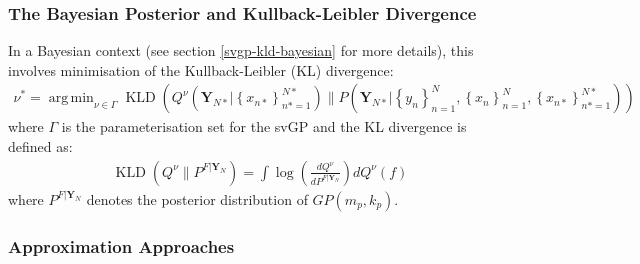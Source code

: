 \documentclass{article}
\newtheorem{theorem}{THEOREM}
\newtheorem{definition}[theorem]{DEFINITION}
\newenvironment{proof}{
PROOF:
\begin{quotation}}{
$\Box$ \end{quotation}}
\newcommand{\nats}{\mbox{\( \mathbb N \)}}
\newcommand{\KLD}{\operatorname{KLD}}
\DeclareMathOperator*{\argmin}{arg\,min}
\numberwithin{equation}{section}
\begin{document}
\subsubsection{The Bayesian Posterior and Kullback-Leibler Divergence}
In a Bayesian context (see section \ref{svgp-kld-bayesian} for more details), this involves minimisation of the Kullback-Leibler (KL) divergence:
\begin{align}
    \nu^* = \argmin_{\nu \in \Gamma} \KLD\left(Q^\nu\left(\mathbf{Y}_{N*} \Big\vert \left\{ x_{n*}\right\}_{n*=1}^{N*}\right) \Big\| P\left(\mathbf{Y}_{N*} \Big\vert \left\{ y_n\right\}_{n=1}^N,  \left\{ x_n\right\}_{n=1}^N,  \left\{ x_{n*}\right\}_{n*=1}^{N*}\right) \right)
    \label{svgp-minimiser}
\end{align}
where $\Gamma$ is the parameterisation set for the svGP and the KL divergence is defined as:
\begin{align}
    \KLD\left(Q^{\nu} \Big\| P^{F \vert \mathbf{Y}_N} \right) = \int \log \left( \frac{dQ^{\nu}}{d P^{F \vert \mathbf{Y}_N}} \right) d Q^{\nu}(f)
    \label{svgp-kld-loss}
\end{align}
where $P^{F \vert \mathbf{Y}_N}$ denotes the posterior distribution of $GP(m_p, k_p)$.
\subsubsection{Approximation Approaches}




\newpage
\end{document}
